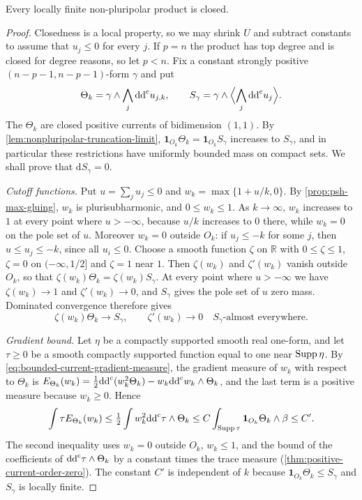 \begin{theorem}\label{thm:nonpluripolar-product-closed}
Every locally finite non-pluripolar product is closed.
\end{theorem}
\begin{proof}
Closedness is a local property, so we may shrink $U$ and subtract constants to assume that $u_j\leq0$ for every $j$. If $p=n$ the product has top degree and is closed for degree reasons, so let $p<n$. Fix a constant strongly positive $(n-p-1,n-p-1)$-form $\gamma$ and put
\[
 \Theta_k=\gamma\wedge\bigwedge_j\mathrm{dd}^{\mathrm{c}} u_{j,k},\qquad
 S_\gamma=\gamma\wedge\Bigl\langle\bigwedge_j\mathrm{dd}^{\mathrm{c}} u_j\Bigr\rangle.
\]
The $\Theta_k$ are closed positive currents of bidimension $(1,1)$. By \cref{lem:nonpluripolar-truncation-limit}, $\mathbf1_{O_k}\Theta_k=\mathbf1_{O_k}S_\gamma$ increases to $S_\gamma$, and in particular these restrictions have uniformly bounded mass on compact sets. We shall prove that $\mathrm dS_\gamma=0$.

\emph{Cutoff functions.} Put $u=\sum_ju_j\leq0$ and $w_k=\max\{1+u/k,0\}$. By \cref{prop:psh-max-gluing}, $w_k$ is plurisubharmonic, and $0\leq w_k\leq1$. As $k\to\infty$, $w_k$ increases to $1$ at every point where $u>-\infty$, because $u/k$ increases to $0$ there, while $w_k=0$ on the pole set of $u$. Moreover $w_k=0$ outside $O_k$: if $u_j\leq-k$ for some $j$, then $u\leq u_j\leq-k$, since all $u_i\leq0$. Choose a smooth function $\zeta$ on $\mathbb R$ with $0\leq\zeta\leq1$, $\zeta=0$ on $(-\infty,1/2]$ and $\zeta=1$ near $1$. Then $\zeta(w_k)$ and $\zeta'(w_k)$ vanish outside $O_k$, so that $\zeta(w_k)\Theta_k=\zeta(w_k)S_\gamma$. At every point where $u>-\infty$ we have $\zeta(w_k)\to1$ and $\zeta'(w_k)\to0$, and $S_\gamma$ gives the pole set of $u$ zero mass. Dominated convergence therefore gives
\[
 \zeta(w_k)\Theta_k\longrightarrow S_\gamma,
 \qquad \zeta'(w_k)\longrightarrow0
                         \quad S_\gamma\text{-almost everywhere}.
\]

\emph{Gradient bound.} Let $\eta$ be a compactly supported smooth real one-form, and let $\tau\geq0$ be a smooth compactly supported function equal to one near $\operatorname{Supp}\eta$. By \eqref{eq:bounded-current-gradient-measure}, the gradient measure of $w_k$ with respect to $\Theta_k$ is $E_{\Theta_k}(w_k)=\frac12\mathrm{dd}^{\mathrm{c}}(w_k^2\Theta_k)-w_k\mathrm{dd}^{\mathrm{c}} w_k\wedge\Theta_k$, and the last term is a positive measure because $w_k\geq0$. Hence
\[
 \int\tau E_{\Theta_k}(w_k)
 \leq\tfrac12\int w_k^2\mathrm{dd}^{\mathrm{c}}\tau\wedge\Theta_k
 \leq C\int_{\operatorname{Supp}\tau}
                           \mathbf1_{O_k}\Theta_k\wedge\beta\leq C'.
\]
The second inequality uses $w_k=0$ outside $O_k$, $w_k\leq1$, and the bound of the coefficients of $\mathrm{dd}^{\mathrm{c}}\tau\wedge\Theta_k$ by a constant times the trace measure (\cref{thm:positive-current-order-zero}). The constant $C'$ is independent of $k$ because $\mathbf1_{O_k}\Theta_k\leq S_\gamma$ and $S_\gamma$ is locally finite.


\end{proof}
